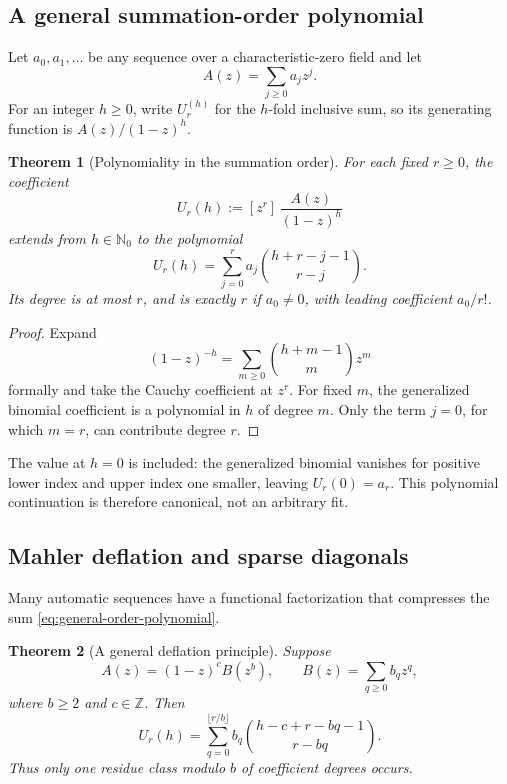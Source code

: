 \documentclass[11pt,oneside]{article}
\numberwithin{equation}{section}
\newtheorem{theorem}{Theorem}[section]
\theoremstyle{definition}
\theoremstyle{remark}
\newcommand{\Nzero}{\mathbb N_0}
\newcommand{\Z}{\mathbb Z}
\newcommand{\coeff}[2]{[z^{#1}]\,#2}
\begin{document}
\subsection{A general summation-order polynomial}

Let \(a_0,a_1,\ldots\) be any sequence over a characteristic-zero field and
let
\[
 A(z)=\sum_{j\ge0}a_jz^j.
\]
For an integer \(h\ge0\), write \(U_r^{(h)}\) for the \(h\)-fold inclusive
sum, so its generating function is \(A(z)/(1-z)^h\).

\begin{theorem}[Polynomiality in the summation order]
For each fixed \(r\ge0\), the coefficient
\begin{equation}
 U_r(h):=\coeff{r}{\frac{A(z)}{(1-z)^h}}
 \label{eq:general-U}
\end{equation}
extends from \(h\in\Nzero\) to the polynomial
\begin{equation}
 \boxed{
 U_r(h)=\sum_{j=0}^{r}a_j
 \binom{h+r-j-1}{r-j}.}
 \label{eq:general-order-polynomial}
\end{equation}
Its degree is at most \(r\), and is exactly \(r\) if \(a_0\ne0\), with
leading coefficient \(a_0/r!\).
\end{theorem}

\begin{proof}
Expand
\[
 (1-z)^{-h}=\sum_{m\ge0}\binom{h+m-1}{m}z^m
\]
formally and take the Cauchy coefficient at \(z^r\).  For fixed \(m\), the
generalized binomial coefficient is a polynomial in \(h\) of degree \(m\).
Only the term \(j=0\), for which \(m=r\), can contribute degree \(r\).
\end{proof}

The value at \(h=0\) is included: the generalized binomial vanishes for
positive lower index and upper index one smaller, leaving \(U_r(0)=a_r\).
This polynomial continuation is therefore canonical, not an arbitrary fit.

\subsection{Mahler deflation and sparse diagonals}

Many automatic sequences have a functional factorization that compresses the
sum \eqref{eq:general-order-polynomial}.

\begin{theorem}[A general deflation principle]
Suppose
\begin{equation}
 A(z)=(1-z)^cB(z^b),
 \qquad
 B(z)=\sum_{q\ge0}b_qz^q,
 \label{eq:general-deflation-hypothesis}
\end{equation}
where \(b\ge2\) and \(c\in\Z\).  Then
\begin{equation}
 \boxed{
 U_r(h)=
 \sum_{q=0}^{\lfloor r/b\rfloor}b_q
 \binom{h-c+r-bq-1}{r-bq}.}
 \label{eq:general-deflation}
\end{equation}
Thus only one residue class modulo \(b\) of coefficient degrees occurs.
\end{theorem}
\end{document}
